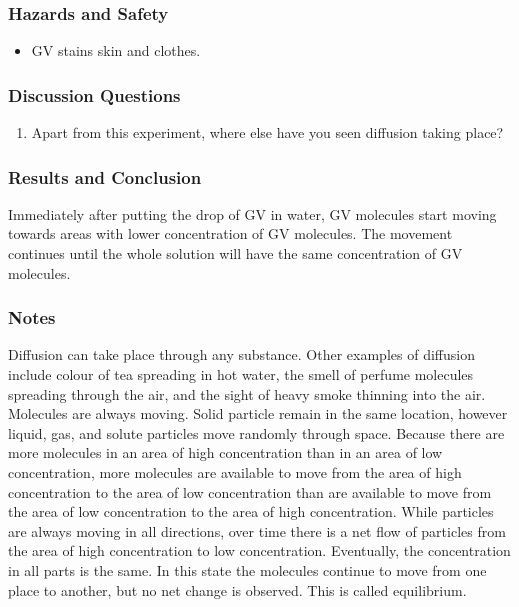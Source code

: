 \subsubsection*{Hazards and Safety}
\begin{itemize}
\item{GV stains skin and clothes.}
\end{itemize}

\subsubsection*{Discussion Questions}
\begin{enumerate}
\item{Apart from this experiment, where else have you seen diffusion taking place?}
\end{enumerate}

\subsubsection*{Results and Conclusion}
Immediately after putting the drop of GV in water, GV molecules start moving towards areas with lower concentration of GV molecules. The movement continues until the whole solution will have the same concentration of GV molecules.

\subsubsection*{Notes}
Diffusion can take place through any substance. Other examples of diffusion include colour of tea spreading in hot water, the smell of perfume molecules spreading through the air, and the sight of heavy smoke thinning into the air.
Molecules are always moving. Solid particle remain in the same location, however liquid, gas, and solute particles move randomly through space. Because there are more molecules in an area of high concentration than in an area of low concentration, more molecules are available to move from the area of high concentration to the area of low concentration than are available to move from the area of low concentration to the area of high concentration. While particles are always moving in all directions, over time there is a net flow of particles from the area of high concentration to low concentration. Eventually, the concentration in all parts is the same. In this state the molecules continue to move from one place to another, but no net change is observed. This is called equilibrium.

